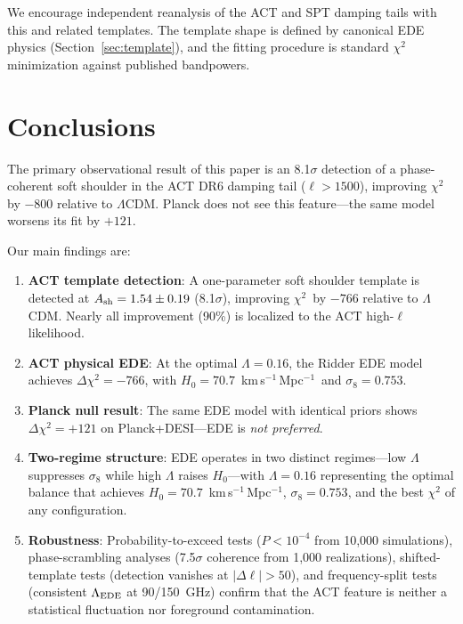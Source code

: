 \documentclass[twocolumn,showpacs,preprintnumbers,amsmath,amssymb,prd]{revtex4-2}
\newcommand{\lcdm}{$\Lambda$CDM}
\newcommand{\chisq}{$\chi^2$}
\newcommand{\kms}{km\,s$^{-1}$\,Mpc$^{-1}$}
\begin{document}
We encourage independent reanalysis of the ACT and SPT damping tails 
with this and related templates. The template shape is defined by 
canonical EDE physics (Section~\ref{sec:template}), and the fitting 
procedure is standard $\chi^2$ minimization against published bandpowers.

\section{Conclusions}
\label{sec:conclusions}

The primary observational result of this paper is an 8.1$\sigma$ detection 
of a phase-coherent soft shoulder in the ACT DR6 damping tail ($\ell > 1500$), 
improving $\chi^2$ by $-800$ relative to \lcdm. Planck does not see this 
feature---the same model worsens its fit by $+121$.

Our main findings are:

\begin{enumerate}
\item \textbf{ACT template detection}: A one-parameter soft shoulder template 
is detected at $A_{\rm sh} = 1.54 \pm 0.19$ (8.1$\sigma$), improving \chisq\ 
by $-766$ relative to \lcdm. Nearly all improvement (90\%) is localized to the 
ACT high-$\ell$ likelihood.

\item \textbf{ACT physical EDE}: At the optimal $\Lambda = 0.16$, the Ridder EDE 
model achieves $\Delta\chi^2 = -766$, with $H_0 = 70.7$~\kms\ and $\sigma_8 = 0.753$.

\item \textbf{Planck null result}: The same EDE model with identical priors 
shows $\Delta\chi^2 = +121$ on Planck+DESI---EDE is \emph{not preferred}.

\item \textbf{Two-regime structure}: EDE operates in two distinct regimes---low 
$\Lambda$ suppresses $\sigma_8$ while high $\Lambda$ raises $H_0$---with 
$\Lambda = 0.16$ representing the optimal balance that achieves 
$H_0 = 70.7$~\kms, $\sigma_8 = 0.753$, and the best $\chi^2$ of any configuration.

\item \textbf{Robustness}: Probability-to-exceed tests ($P < 10^{-4}$ from 
10,000 simulations), phase-scrambling analyses (7.5$\sigma$ coherence from 
1,000 realizations), shifted-template tests (detection vanishes at 
$|\Delta\ell| > 50$), and frequency-split tests (consistent $\Lambda_{\rm EDE}$ 
at 90/150~GHz) confirm that the ACT feature is neither a statistical 
fluctuation nor foreground contamination.
\end{enumerate}
\end{document}
